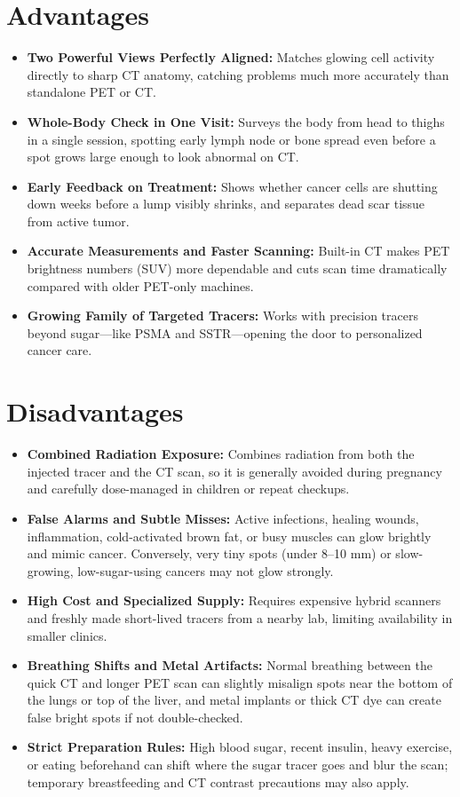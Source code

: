 \section{Advantages}

\begin{itemize}
    \item \textbf{Two Powerful Views Perfectly Aligned:} Matches glowing cell activity directly to sharp CT anatomy, catching problems much more accurately than standalone PET or CT.
    \item \textbf{Whole-Body Check in One Visit:} Surveys the body from head to thighs in a single session, spotting early lymph node or bone spread even before a spot grows large enough to look abnormal on CT.
    \item \textbf{Early Feedback on Treatment:} Shows whether cancer cells are shutting down weeks before a lump visibly shrinks, and separates dead scar tissue from active tumor.
    \item \textbf{Accurate Measurements and Faster Scanning:} Built-in CT makes PET brightness numbers (SUV) more dependable and cuts scan time dramatically compared with older PET-only machines.
    \item \textbf{Growing Family of Targeted Tracers:} Works with precision tracers beyond sugar---like PSMA and SSTR---opening the door to personalized cancer care.
\end{itemize}

\section{Disadvantages}

\begin{itemize}
    \item \textbf{Combined Radiation Exposure:} Combines radiation from both the injected tracer and the CT scan, so it is generally avoided during pregnancy and carefully dose-managed in children or repeat checkups.
    \item \textbf{False Alarms and Subtle Misses:} Active infections, healing wounds, inflammation, cold-activated brown fat, or busy muscles can glow brightly and mimic cancer. Conversely, very tiny spots (under 8--10 mm) or slow-growing, low-sugar-using cancers may not glow strongly.
    \item \textbf{High Cost and Specialized Supply:} Requires expensive hybrid scanners and freshly made short-lived tracers from a nearby lab, limiting availability in smaller clinics.
    \item \textbf{Breathing Shifts and Metal Artifacts:} Normal breathing between the quick CT and longer PET scan can slightly misalign spots near the bottom of the lungs or top of the liver, and metal implants or thick CT dye can create false bright spots if not double-checked.
    \item \textbf{Strict Preparation Rules:} High blood sugar, recent insulin, heavy exercise, or eating beforehand can shift where the sugar tracer goes and blur the scan; temporary breastfeeding and CT contrast precautions may also apply.
\end{itemize}

